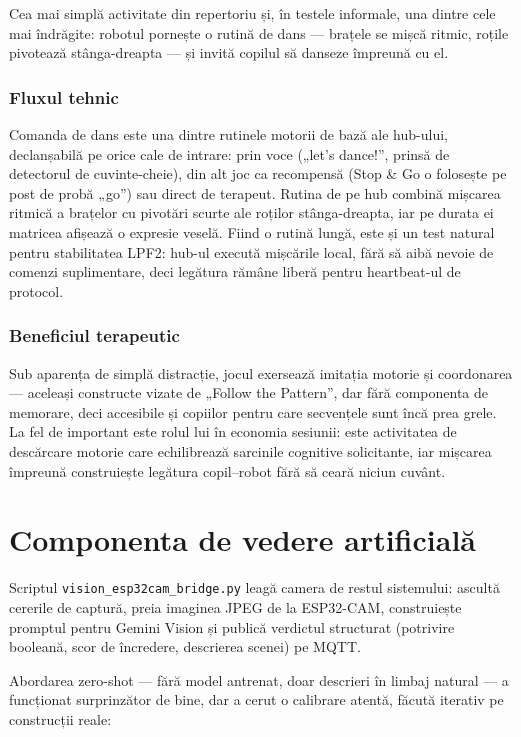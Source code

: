 Cea mai simplă activitate din repertoriu și, în testele informale, una dintre cele mai îndrăgite: robotul pornește o rutină de dans — brațele se mișcă ritmic, roțile pivotează stânga-dreapta — și invită copilul să danseze împreună cu el.

\subsubsection*{Fluxul tehnic}
Comanda de dans este una dintre rutinele motorii de bază ale hub-ului, declanșabilă pe orice cale de intrare: prin voce („let's dance!”, prinsă de detectorul de cuvinte-cheie), din alt joc ca recompensă (Stop \& Go o folosește pe post de probă „go”) sau direct de terapeut. Rutina de pe hub combină mișcarea ritmică a brațelor cu pivotări scurte ale roților stânga-dreapta, iar pe durata ei matricea afișează o expresie veselă. Fiind o rutină lungă, este și un test natural pentru stabilitatea LPF2: hub-ul execută mișcările local, fără să aibă nevoie de comenzi suplimentare, deci legătura rămâne liberă pentru heartbeat-ul de protocol.

\subsubsection*{Beneficiul terapeutic}
Sub aparența de simplă distracție, jocul exersează imitația motorie și coordonarea — aceleași constructe vizate de „Follow the Pattern”, dar fără componenta de memorare, deci accesibile și copiilor pentru care secvențele sunt încă prea grele. La fel de important este rolul lui în economia sesiunii: este activitatea de descărcare motorie care echilibrează sarcinile cognitive solicitante, iar mișcarea împreună construiește legătura copil--robot fără să ceară niciun cuvânt.

\section{Componenta de vedere artificială}
\label{sec:viziune}

Scriptul \texttt{vision\_esp32cam\_bridge.py} leagă camera de restul sistemului: ascultă cererile de captură, preia imaginea JPEG de la ESP32-CAM, construiește promptul pentru Gemini Vision și publică verdictul structurat (potrivire booleană, scor de încredere, descrierea scenei) pe MQTT.

Abordarea zero-shot — fără model antrenat, doar descrieri în limbaj natural — a funcționat surprinzător de bine, dar a cerut o calibrare atentă, făcută iterativ pe construcții reale:

